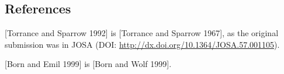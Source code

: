 \documentclass[12pt, twoside,a4paper]{article}
\begin{document}
\subsection{References}
\begin{description}
\item {[Torrance and Sparrow 1992]} is {[Torrance and Sparrow 1967]}, as the original submission was in JOSA (DOI: \url{http://dx.doi.org/10.1364/JOSA.57.001105}).
\item {[Born and Emil 1999]} is {[Born and Wolf 1999]}.
\end{description}
\end{document}
